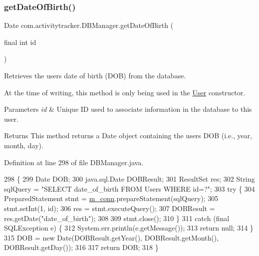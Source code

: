 \subsubsection{\texorpdfstring{get\+Date\+Of\+Birth()}{getDateOfBirth()}}
{\footnotesize\ttfamily Date com.\+activitytracker.\+D\+B\+Manager.\+get\+Date\+Of\+Birth (\begin{DoxyParamCaption}\item[{final int}]{id }\end{DoxyParamCaption})}

Retrieves the user\textquotesingle{}s date of birth (D\+OB) from the database.

At the time of writing, this method is only being used in the \mbox{\hyperlink{classcom_1_1activitytracker_1_1_user}{User}} constructor.


\begin{DoxyParams}{Parameters}
{\em id} & Unique ID used to associate information in the database to this user.\\
\hline
\end{DoxyParams}
\begin{DoxyReturn}{Returns}
This method returns a Date object containing the user\textquotesingle{}s D\+OB (i.\+e., year, month, day). 
\end{DoxyReturn}


Definition at line 298 of file D\+B\+Manager.\+java.


\begin{DoxyCode}
298                                              \{
299         Date DOB;
300         java.sql.Date DOBResult;
301         ResultSet res;
302         String sqlQuery = \textcolor{stringliteral}{"SELECT date\_of\_birth FROM Users WHERE id=?"};
303         \textcolor{keywordflow}{try} \{
304             PreparedStatement stmt = \mbox{\hyperlink{classcom_1_1activitytracker_1_1_d_b_manager_a064088d13ac09eb147fdc19268771521}{m\_conn}}.prepareStatement(sqlQuery);
305             stmt.setInt(1, \textcolor{keywordtype}{id});
306             res = stmt.executeQuery();
307             DOBResult = res.getDate(\textcolor{stringliteral}{"date\_of\_birth"});
308 
309             stmt.close();
310         \}
311         \textcolor{keywordflow}{catch} (\textcolor{keyword}{final} SQLException e) \{
312             System.err.println(e.getMessage());
313             \textcolor{keywordflow}{return} null;
314         \}
315         DOB = \textcolor{keyword}{new} Date(DOBResult.getYear(), DOBResult.getMonth(), DOBResult.getDay());
316 
317         \textcolor{keywordflow}{return} DOB;
318     \}
\end{DoxyCode}
\mbox{\label{classcom_1_1activitytracker_1_1_d_b_manager_a666452f1e5862f90c06b0beb9a9fcfdd}} 
